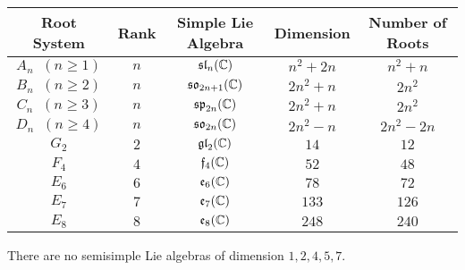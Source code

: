 \documentclass[a4paper]{article}
\begin{document}
\begin{table}[]
\centering
\begin{tabular}{|c|c|c|c|c|}
\hline
Root System                                        & Rank & Simple Lie Algebra         & Dimension & Number of Roots \\ \hline
$A_n\;\;(n\geq 1)$ & $n$  & $\mathfrak{sl}_n(\mathbb{C})$      & $n^2+2n$  & $n^2+n$         \\
$B_n\;\;(n\geq 2)$ & $n$  & $\mathfrak{so}_{2n+1}(\mathbb{C})$ & $2n^2+n$  & $2n^2$          \\
$C_n\;\;(n\geq 3)$ & $n$  & $\mathfrak{sp}_{2n}(\mathbb{C})$   & $2n^2+n$  & $2n^2$          \\
$D_n\;\;(n\geq 4)$ & $n$  & $\mathfrak{so}_{2n}(\mathbb{C})$   & $2n^2-n$  & $2n^2-2n$       \\
$G_2$                                              & $2$  & $\mathfrak{gl}_2(\mathbb{C})$      & $14$      & $12$            \\
$F_4$                                              & $4$  & $\mathfrak{f}_4(\mathbb{C})$       & $52$      & $48$            \\
$E_6$                                              & $6$  & $\mathfrak{e}_6(\mathbb{C})$       & $78$      & $72$            \\
$E_7$                                              & $7$  & $\mathfrak{e}_7(\mathbb{C})$       & $133$     & $126$           \\
$E_8$                                              & $8$  & $\mathfrak{e}_8(\mathbb{C})$       & $248$     & $240$           \\ \hline
\end{tabular}
\end{table}

\begin{crl}{}{} There are no semisimple Lie algebras of dimension $1,2,4,5,7$. 
\end{crl}
\end{document}
